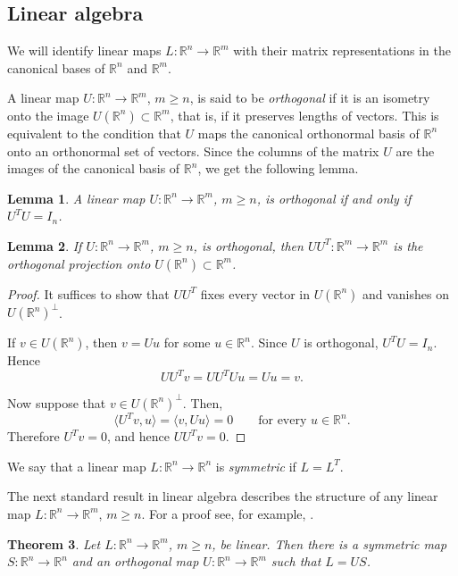 \documentclass[12pt,leqno]{amsart}
\newtheorem{theorem}{Theorem}
\newtheorem{lemma}[theorem]{Lemma}
\theoremstyle{definition}
\newcommand{\bbbr}{\mathbb R}
\numberwithin{theorem}{section} \numberwithin{equation}{section}
\begin{document}
\subsection{Linear algebra}
We will identify linear maps $L:\mathbb{R}^{n}\to \mathbb{R}^{m}$ with
their matrix representations in the canonical bases of $\mathbb{R}^{n}$
and $\mathbb{R}^{m}$.

A linear map $U:\mathbb{R}^{n}\to \mathbb{R}^{m}$, $m\geq n$, is said
to be \emph{orthogonal} if it is an isometry onto the image
$U(\mathbb{R}^{n})\subset \mathbb{R}^{m}$, that is, if it preserves
lengths of vectors. This is equivalent to the condition that $U$ maps
the canonical orthonormal basis of $\mathbb{R}^{n}$ onto an orthonormal
set of vectors. Since the columns of the matrix $U$ are the images of
the canonical basis of $\mathbb{R}^{n}$, we get the following lemma.

\begin{lemma}
\label{AT9}
A linear map $U:\mathbb{R}^{n}\to \mathbb{R}^{m}$, $m\geq n$, is
orthogonal if and only if
$U^{T}U=I_{n}$.
\end{lemma}

\begin{lemma}
\label{AT10}
If $U:\mathbb{R}^{n}\to\mathbb{R}^{m}$, $m\geq n$, is orthogonal, then
$UU^{T}:\mathbb{R}^{m}\to\mathbb{R}^{m}$
is the orthogonal projection onto $U(\mathbb{R}^{n})\subset\mathbb{R}^{m}$.
\end{lemma}
\begin{proof}
It suffices to show that $UU^{T}$ fixes every vector in
$U(\mathbb{R}^{n})$ and vanishes on $U(\mathbb{R}^{n})^{\perp}$.

If $v\in U(\mathbb{R}^{n})$, then $v=Uu$ for some $u\in\mathbb{R}^{n}$.
Since $U$ is orthogonal, $U^{T}U=I_{n}$. Hence
\[
UU^{T}v=UU^{T}Uu=Uu=v.
\]

Now suppose that $v\in U(\mathbb{R}^{n})^{\perp}$. Then,
\[
\langle U^{T}v,u\rangle
=
\langle v,Uu\rangle
=
0
\qquad
\text{for every } u\in\bbbr^n.
\]
Therefore $U^{T}v=0$, and hence
$UU^{T}v=0$.
\end{proof}


We say that a linear map $L:\mathbb{R}^{n}\to \mathbb{R}^{n}$ is
\emph{symmetric} if $L=L^{T}$.


The next standard result in linear algebra describes the structure of any
linear map $L:\mathbb{R}^{n}\to \mathbb{R}^{m}$, $m\geq n$. For a proof
see, for example, \cite[Theorem~3.5]{evans}.

\begin{theorem}
\label{AT11}
Let $L:\mathbb{R}^{n}\to \mathbb{R}^{m}$, $m\geq n$, be linear. Then
there is a symmetric map $S:\mathbb{R}^{n}\to \mathbb{R}^{n}$ and an
orthogonal map $U:\mathbb{R}^{n}\to \mathbb{R}^{m}$ such that
$L=US$.
\end{theorem}
\end{document}
